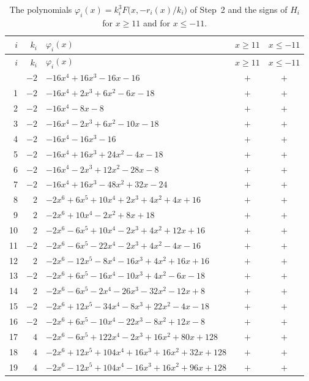 \documentclass[11pt]{article}
\begin{document}
\begingroup\footnotesize
\setlength{\LTcapwidth}{\textwidth}
\begin{longtable}{@{}rrlcc@{}}
\caption{The polynomials $\varphi_i(x)=k_i^3F\bigl(x,-r_i(x)/k_i\bigr)$ of Step~2 and the signs of $H_i$ for $x\geq11$ and for $x\leq-11$.}\label{tab:phi}\\
\hline $i$ & $k_i$ & $\varphi_i(x)$ & $x\geq11$ & $x\leq-11$\\\hline\endfirsthead\hline $i$ & $k_i$ & $\varphi_i(x)$ & $x\geq11$ & $x\leq-11$\\\hline\endhead\hline\endfoot
0 & $-2$ & $-16x^{4}+16x^{3}-16x-16$ & $+$ & $+$\\
1 & $-2$ & $-16x^{4}+2x^{3}+6x^{2}-6x-18$ & $+$ & $+$\\
2 & $-2$ & $-16x^{4}-8x-8$ & $+$ & $+$\\
3 & $-2$ & $-16x^{4}-2x^{3}+6x^{2}-10x-18$ & $+$ & $+$\\
4 & $-2$ & $-16x^{4}-16x^{3}-16$ & $+$ & $+$\\
5 & $-2$ & $-16x^{4}+16x^{3}+24x^{2}-4x-18$ & $+$ & $+$\\
6 & $-2$ & $-16x^{4}-2x^{3}+12x^{2}-28x-8$ & $+$ & $+$\\
7 & $-2$ & $-16x^{4}+16x^{3}-48x^{2}+32x-24$ & $+$ & $+$\\
8 & $2$ & $-2x^{6}+6x^{5}+10x^{4}+2x^{3}+4x^{2}+4x+16$ & $+$ & $+$\\
9 & $2$ & $-2x^{6}+10x^{4}-2x^{2}+8x+18$ & $+$ & $+$\\
10 & $2$ & $-2x^{6}-6x^{5}+10x^{4}-2x^{3}+4x^{2}+12x+16$ & $+$ & $+$\\
11 & $-2$ & $-2x^{6}-6x^{5}-22x^{4}-2x^{3}+4x^{2}-4x-16$ & $+$ & $+$\\
12 & $2$ & $-2x^{6}-12x^{5}-8x^{4}-16x^{3}+4x^{2}+16x+16$ & $+$ & $+$\\
13 & $-2$ & $-2x^{6}+6x^{5}-16x^{4}-10x^{3}+4x^{2}-6x-18$ & $+$ & $+$\\
14 & $2$ & $-2x^{6}-6x^{5}-2x^{4}-26x^{3}-32x^{2}-12x+8$ & $+$ & $+$\\
15 & $-2$ & $-2x^{6}+12x^{5}-34x^{4}-8x^{3}+22x^{2}-4x-18$ & $+$ & $+$\\
16 & $-2$ & $-2x^{6}+6x^{5}-10x^{4}-22x^{3}-8x^{2}+12x-8$ & $+$ & $+$\\
17 & $4$ & $-2x^{6}-6x^{5}+122x^{4}-2x^{3}+16x^{2}+80x+128$ & $+$ & $+$\\
18 & $4$ & $-2x^{6}+12x^{5}+104x^{4}+16x^{3}+16x^{2}+32x+128$ & $+$ & $+$\\
19 & $4$ & $-2x^{6}-12x^{5}+104x^{4}-16x^{3}+16x^{2}+96x+128$ & $+$ & $+$\\

\end{longtable}
\end{document}
